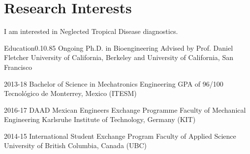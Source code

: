 \documentclass{federico_cv}
\begin{document}
{\MYhref{}{}}
{}


\section{Research Interests}
I am interested in Neglected Tropical Disease diagnostics.


\begin{tblSection}{Education}{0.1}{0.85}
\degree
{Ongoing}
{Ph.D. in Bioengineering}
{Advised by Prof. Daniel Fletcher}
{University of California, Berkeley and University of California, San Francisco}

\degree
{2013-18}
{Bachelor of Science in Mechatronics Engineering}
{GPA of 96/100}
{Tecnológico de Monterrey, Mexico (ITESM)}

\degree
{2016-17}
{DAAD Mexican Engineers Exchange Programme}
{Faculty of Mechanical Engineering}
{Karlsruhe Institute of Technology, Germany (KIT)}

\degree
{2014-15}
{International Student Exchange Program}
{Faculty of Applied Science}
{University of British Columbia, Canada (UBC)}

\end{tblSection}


\nocite{*}
\printbibliography[keyword={Publications},title={Publications},resetnumbers=true]
\end{document}
